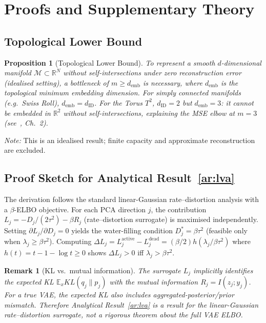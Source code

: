 \documentclass[11pt,a4paper]{article}
\newtheorem{proposition}{Proposition}
\newtheorem{remark}{Remark}
\newcommand{\dID}{d_{\mathrm{ID}}}
\newcommand{\R}{\mathbb{R}}
\newcommand{\demb}{d_{\mathrm{emb}}}
\begin{document}
\section{Proofs and Supplementary Theory}\label{app:proofs}

\subsection{Topological Lower Bound}\label{app:lower_bound}

\begin{proposition}[Topological Lower Bound]
To represent a smooth $d$-dimensional manifold $\mathcal{M}\subset\R^N$
without self-intersections under zero reconstruction error (idealised setting),
a bottleneck of $m\geq\demb$ is necessary, where $\demb$ is the topological
minimum embedding dimension.
For simply connected manifolds (e.g.\ Swiss Roll), $\demb=\dID$.
For the Torus $T^2$, $\dID=2$ but $\demb=3$: it cannot be embedded in $\R^2$
without self-intersections, explaining the MSE elbow at $m=3$
(see~\cite{hatcher2002algebraic}, Ch.~2).
\end{proposition}

\noindent
\textit{Note:} This is an idealised result; finite capacity and approximate
reconstruction are excluded.

\subsection{Proof Sketch for Analytical Result~\ref{ar:lva}}\label{app:linear_vae_proof}

The derivation follows the standard linear-Gaussian rate--distortion analysis
with a $\beta$-ELBO objective.  For each PCA direction $j$, the contribution
$L_j = -D_j/(2\tau^2) - \beta R_j$ (rate--distortion surrogate) is maximised
independently.
Setting $\partial L_j/\partial D_j=0$ yields the water-filling condition
$D_j^*=\beta\tau^2$ (feasible only when $\lambda_j\geq\beta\tau^2$).
Computing $\Delta L_j = L_j^{\mathrm{active}}-L_j^{\mathrm{dead}}
= (\beta/2)h(\lambda_j/\beta\tau^2)$ where $h(t)=t-1-\log t\geq0$
shows $\Delta L_j>0$ iff $\lambda_j>\beta\tau^2$.

\begin{remark}[KL vs.\ mutual information]
The surrogate $L_j$ implicitly identifies the expected KL $\mathbb{E}_xKL(q_j\|p_j)$
with the mutual information $R_j=I(z_j;y_j)$.
For a true VAE, the expected KL also includes aggregated-posterior/prior mismatch.
Therefore Analytical Result~\ref{ar:lva} is a result for the \emph{linear-Gaussian
rate--distortion surrogate}, not a rigorous theorem about the full VAE ELBO.
\end{remark}
\end{document}
